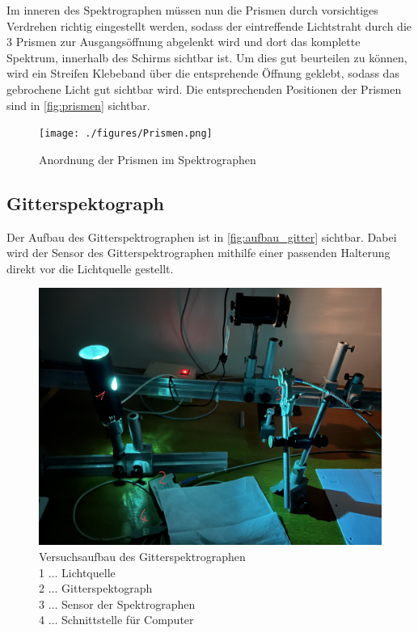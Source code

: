 \documentclass[12pt,english,ngerman]{scrartcl}
\begin{document}
Im inneren des Spektrographen müssen nun die Prismen durch vorsichtiges Verdrehen richtig eingestellt werden, sodass der 
eintreffende Lichtstraht durch die 3 Prismen zur Ausgangsöffnung abgelenkt wird und dort das komplette Spektrum, innerhalb
des Schirms sichtbar ist. Um dies gut beurteilen zu können, wird ein Streifen Klebeband über die entsprehende Öffnung geklebt,
sodass das gebrochene Licht gut sichtbar wird. Die entsprechenden Positionen der Prismen sind in \autoref{fig:prismen} sichtbar.

\begin{figure}[H]
	\begin{center}
		\texttt{[image: ./figures/Prismen.png]}
	\end{center}
	\caption[Anordnung der Prismen im Spektrographen]
	{Anordnung der Prismen im Spektrographen
	}\label{fig:prismen}
\end{figure}

\subsection{Gitterspektograph}

Der Aufbau des Gitterspektrographen ist in \autoref{fig:aufbau_gitter} sichtbar. Dabei wird der Sensor des Gitterspektrographen
mithilfe einer passenden Halterung direkt vor die Lichtquelle gestellt.
\begin{figure}[H]
	\begin{center}
		\includegraphics[width =\textwidth]{./figures/Gitterspektograph.png}
	\end{center}
	\caption[Versuchsaufbau des Gitterspektrographen]
	{Versuchsaufbau des Gitterspektrographen \\
	1 \(\dots\) Lichtquelle \\
	2 \(\dots\) Gitterspektograph \\
	3 \(\dots\) Sensor der Spektrographen \\
	4 \(\dots\) Schnittstelle für Computer
	}\label{fig:aufbau_gitter}
\end{figure}
\end{document}
